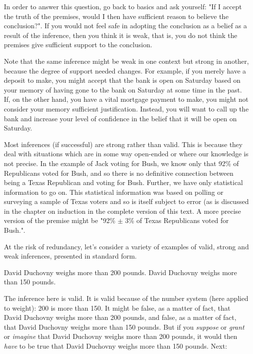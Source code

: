 In order to answer this question, go back to basics and ask yourself: "If I accept the truth of the premises, would I then have sufficient reason to believe the conclusion?". If you would not feel safe in adopting the conclusion as a belief as a result of the inference, then you think it is weak, that is, you do not think the premises give sufficient support to the conclusion. 

Note that the same inference might be weak in one context but strong in another, because the degree of support needed changes. For example, if you merely have a deposit to make, you might accept that the bank is open on Saturday based on your memory of having gone to the bank on Saturday at some time in the past. If, on the other hand, you have a vital mortgage payment to make, you might not consider your memory sufficient justification. Instead, you will want to call up the bank and increase your level of confidence in the belief that it will be open on Saturday.

Most inferences (if successful) are strong rather than valid. This is because they deal with situations which are in some way open-ended or where our knowledge is not precise. In the example of Jack voting for Bush, we know only that 92\% of Republicans voted for Bush, and so there is no definitive connection between being a Texas Republican and voting for Bush. Further, we have only statistical information to go on. This statistical information was based on polling or surveying a sample of Texas voters and so is itself subject to error (as is discussed in the chapter on induction in the complete version of this text.\label{ver_var}  A more precise version of the premise might be "92\% $\pm$ 3\% of Texas Republicans voted for Bush.".

At the risk of redundancy, let's consider a variety of examples of valid, strong and weak inferences, presented in standard form. 

\begin{earg*}
\item  David Duchovny weighs more than 200 pounds. 
\itemc  David Duchovny weighs more than 150 pounds.
\end{earg*}

The inference here is valid. It is valid because of the number system (here applied to weight): 200 is more than 150. It might be false, as a matter of fact, that David Duchovny weighs more than 200 pounds, and false, as a matter of fact, that David Duchovny weighs more than 150 pounds. But if you \textit{suppose }or \textit{grant }or \textit{imagine }that David Duchovny weighs more than 200 pounds, it would then \textit{have }to be true that David Duchovny weighs more than 150 pounds. Next:

